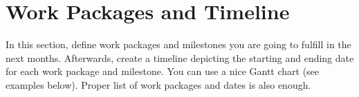 \chapter{Work Packages and Timeline}
In this section, define work packages and milestones you are going to fulfill in the next months.
Afterwards, create a timeline depicting the starting and ending date for each work package and milestone.
You can use a nice Gantt chart (see examples below). Proper list of work packages and dates is also enough.



